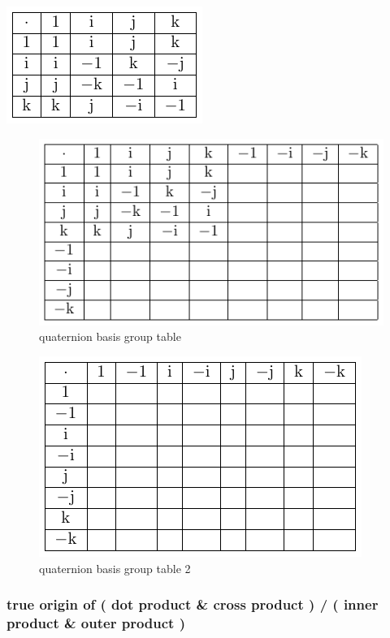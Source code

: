 \documentclass[
]{book}
\theoremstyle{definition}
\theoremstyle{definition}
\theoremstyle{definition}
\theoremstyle{definition}
\theoremstyle{remark}
\begin{document}
\includegraphics{202403251511-quaternion_files/figure-latex/unnamed-chunk-1-1.pdf}

\begin{figure}
\centering
\includegraphics{202403251511-quaternion_files/figure-latex/unnamed-chunk-2-1.pdf}
\caption{\label{fig:unnamed-chunk-2}quaternion basis group table}
\end{figure}

\begin{figure}
\centering
\includegraphics{202403251511-quaternion_files/figure-latex/unnamed-chunk-3-1.pdf}
\caption{\label{fig:unnamed-chunk-3}quaternion basis group table 2}
\end{figure}

\hypertarget{true-origin-of-dot-product-cross-product-inner-product-outer-product}{%
\subsubsection{true origin of ( dot product \& cross product ) / ( inner product \& outer product )}\label{true-origin-of-dot-product-cross-product-inner-product-outer-product}}
\end{document}

